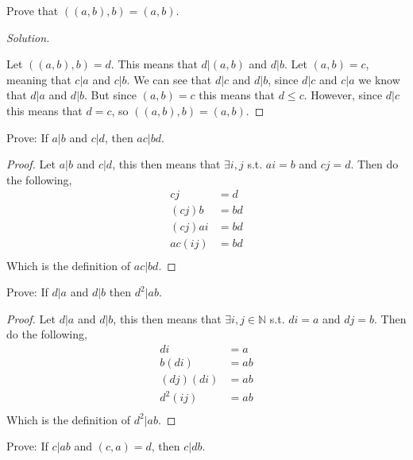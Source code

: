 \documentclass[11pt]{article}
\newcommand{\N}{\mathbb{N}}
\newenvironment{problem}[2][Problem]{\begin{trivlist}
\item[\hskip \labelsep {\bfseries #1}\hskip \labelsep {\bfseries #2.}]}{\end{trivlist}}
\newenvironment{solution}
  {\renewcommand\qedsymbol{$~$}\begin{proof}[Solution]$ $\par\nobreak\ignorespaces}
  {\end{proof}}
\begin{document}
\begin{problem}{9}
Prove that $((a,b),b)=(a,b)$.
\end{problem}

\begin{solution}
  Let $((a,b),b)=d$. This means that $d|(a,b)$ and $d|b$. Let $(a,b)=c$, meaning that $c|a$ and $c|b$. We can see that $d|c$ and $d|b$, since $d|c$ and $c|a$ we know that $d|a$ and $d|b$. But since $(a,b)=c$ this means that $d\leq c$. However, since $d|c$ this means that $d=c$, so $((a,b),b)=(a,b)$.
\end{solution}



\begin{problem}{12}
Prove: If $a|b$ and $c|d$, then $ac|bd$.
\end{problem}

\begin{proof}
  Let $a|b$ and $c|d$, this then means that $\exists i,j$ s.t. $ai=b$ and $cj=d$. Then do the following,
  \begin{align*}
    cj     & = d  \\
    (cj)b  & = bd \\
    (cj)ai & = bd \\
    ac(ij) & = bd \\
  \end{align*}
  Which is the definition of $ac|bd$.
\end{proof}




\begin{problem}{13}
Prove: If $d|a$ and $d|b$ then $d^2|ab$.
\end{problem}

\begin{proof}
  Let $d|a$ and $d|b$, this then means that $\exists i,j \in \N$ s.t. $di=a$ and $dj=b$. Then do the following,
  \begin{align*}
    di       & = a  \\
    b(di)    & = ab \\
    (dj)(di) & = ab \\
    d^2 (ij) & = ab \\
  \end{align*}
  Which is the definition of $d^2|ab$.
\end{proof}




\begin{problem}{14}
Prove: If $c|ab$ and $(c,a)=d$, then $c|db$.
\end{problem}
\end{document}
